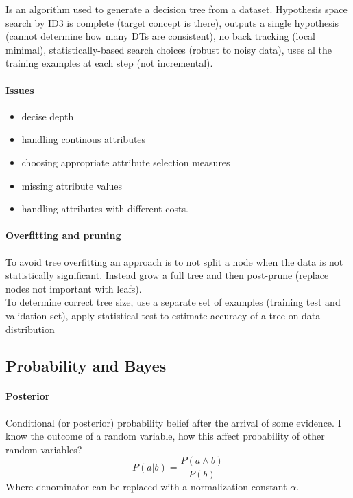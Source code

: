 Is an algorithm used to generate a decision tree from a dataset.
Hypothesis space search by ID3 is complete (target concept is there), outputs a single hypothesis (cannot determine how many DTs are consistent), no back tracking (local minimal), statistically-based search choices (robust to noisy data), uses al the training examples at each step (not incremental).

\paragraph{Issues}
\begin{itemize}
\item decise depth
\item handling continous attributes
\item choosing appropriate attribute selection measures
\item missing attribute values
\item handling attributes with different costs.
\end{itemize}

\paragraph{Overfitting and pruning}
To avoid tree overfitting an approach is to not split a node when the data is not statistically significant. Instead grow a full tree and then post-prune (replace nodes not important with leafs).\\
To determine correct tree size, use a separate set of examples (training test and validation set), apply statistical test to estimate accuracy of a tree on data distribution

\subsection{Probability and Bayes}

\paragraph{Posterior}
Conditional (or posterior) probability belief after the arrival of some evidence. I know the outcome of a random variable, how this affect probability of other random variables?
\[P(a|b)=\frac{P(a \wedge b)}{P(b)}\]
Where denominator can be replaced with a normalization constant $\alpha$.





